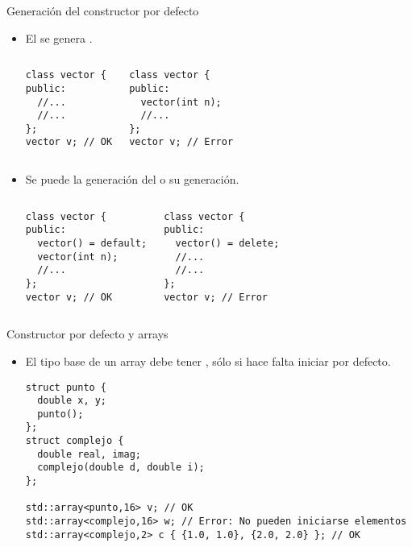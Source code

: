 \begin{frame}[t,fragile]{Generación del constructor por defecto}
\begin{itemize}
  \item El  se genera 
        .

\begin{columns}[T]
\begin{lstlisting}
class vector {
public:
  //...
  //...
};
vector v; // OK
\end{lstlisting}

\begin{lstlisting}
class vector {
public:
  vector(int n);
  //...
};
vector v; // Error
\end{lstlisting}

\end{columns}

\item Se puede  la generación del  o
       su generación.

\begin{columns}[T]
\begin{lstlisting}
class vector {
public:
  vector() = default;
  vector(int n);
  //...
};
vector v; // OK
\end{lstlisting}

\begin{lstlisting}
class vector {
public:
  vector() = delete;
  //...
  //...
};
vector v; // Error
\end{lstlisting}

\end{columns}

\end{itemize}
\end{frame}

\begin{frame}[t,fragile]{Constructor por defecto y arrays}
\begin{itemize}
  \item El tipo base de un array debe tener , 
        sólo si hace falta iniciar por defecto.
\begin{lstlisting}
struct punto {
  double x, y;
  punto();
};
struct complejo {
  double real, imag;
  complejo(double d, double i);
};

std::array<punto,16> v; // OK
std::array<complejo,16> w; // Error: No pueden iniciarse elementos
std::array<complejo,2> c { {1.0, 1.0}, {2.0, 2.0} }; // OK 
\end{lstlisting}
\end{itemize}
\end{frame}

